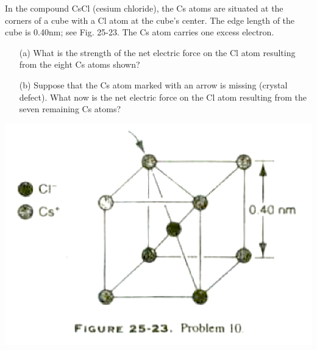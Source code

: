 \documentclass[11pt,letterpaper,boxed]{hmcpset}
\begin{document}
	\begin{problem}[HRK P25.10]
		In the compound CsCl (cesium chloride), the Cs atoms are situated at the corners of a cube with a Cl atom at the cube's center. The edge length of the cube is 0.40nm; see Fig. 25-23. The Cs atom carries one excess electron. 
		
		\begin{enumerate}
			\item[(a)] What is the strength of the net electric force on the Cl atom resulting from the eight Cs atoms shown? 
			\item[(b)] Suppose that the Cs atom marked with an arrow is missing (crystal defect). What now is the net electric force on the Cl atom resulting from the seven remaining Cs atoms?
		\end{enumerate}
	
		\begin{center}
			\includegraphics[scale=0.5]{25-23.png}
		\end{center}

	\end{problem}
	
	\begin{solution}
		\vfill
	\end{solution}
	\newpage
	
\end{document}

